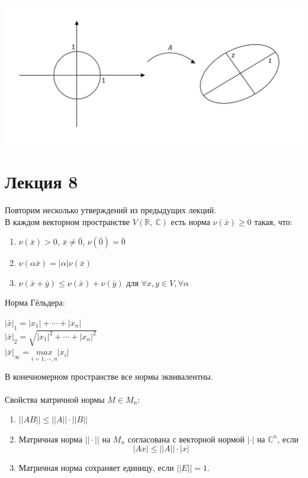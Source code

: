 \documentclass[12pt]{article}
\theoremstyle{definition}
\numberwithin{equation}{section}
\begin{document}
\begin{enumerate}
\begin{center}
			\includegraphics[scale=0.6]{l7_4.png}
		\end{center}
	\end{enumerate}
	
	\section *{Лекция 8}
	\noindent Повторим несколько утверждений из предыдущих лекций.\\
	В каждом векторном пространстве $V(\mathbb{R},~\mathbb{C})$ есть норма $\nu(\bar x)\geqslant 0$ такая, что:\begin{enumerate}
		\item $\nu(\bar x) > 0$, $\bar x \neq \bar 0$, $\nu(\bar 0) = \bar 0$
		\item $\nu(\alpha \bar x) = |\alpha|\nu(\bar x)$
		\item $\nu(\bar x + \bar y) \leq \nu(\bar x) + \nu(\bar y)$ для $\forall x, y \in V, \forall \alpha$
	\end{enumerate}
	Норма Гёльдера: \begin{center}
		$|\bar x|_1=|x_1|+\cdots +|x_n|$\\
		$|\bar x|_2=\sqrt{|x_1|^2+\cdots +|x_n|^2}$\\
		$|\bar x|_{\infty}=\underset{i=1,\cdots,n}{max}|x_i|$ \end{center}
	В конечномерном пространстве все нормы эквивалентны.\\
	\\
	Свойства матричной нормы $M\in M_n$: 
	\begin{enumerate}
		\item $||AB||\leqslant ||A||\cdot ||B||$
		\item Матричная норма $||\cdot||$ на $M_n$ согласована с векторной нормой $|\cdot|$ на $\mathbb{C}^n$, если $$|Ax|\leqslant ||A||\cdot |x|$$
		\item Матричная норма сохраняет единицу, если $||E||=1$.
	\end{enumerate}
\end{document}
